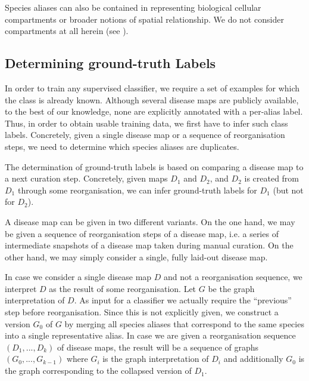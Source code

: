 \documentclass[
	fontsize=10pt, %
	twoside=true, %
	secnumdepth=1, %
  toc=indentunnumbered %
]{kaobook}
\begin{document}
Species aliases can also be contained in  representing
biological cellular compartments or broader notions of spatial relationship. We
do not consider compartments at all herein (see ).





\subsection{Determining ground-truth Labels}
\label{sec:determining-labels}

In order to train any supervised classifier, we require a set of examples for
which the class is already known. Although several disease maps are publicly
available, to the best of our knowledge, none are explicitly annotated with a
per-alias label. Thus, in order to obtain usable training data, we first have to
infer such class labels. Concretely, given a single disease map or a sequence of
reorganisation steps, we need to determine which species aliases are duplicates.

The determination of ground-truth labels is based on comparing a disease map to
a next curation step. Concretely, given maps $D_1$ and $D_2$, and $D_2$ is
created from $D_1$ through some reorganisation, we can infer ground-truth
labels for $D_1$ (but not for $D_2$). 

A disease map can be given in two different variants. On the one hand, we may be
given a sequence of reorganisation steps of a disease map, i.e. a series of intermediate
snapshots of a disease map taken during manual curation. On the other hand, we
may simply consider a single, fully laid-out disease map.

In case we consider a single disease map $D$ and not a reorganisation sequence,
we interpret $D$ as the result of some reorganisation. Let $G$ be the graph
interpretation of $D$. As input for a classifier we actually require the
``previous'' step before reorganisation. Since this is not explicitly given, we
construct a  version $G_0$ of $G$ by merging all species aliases
that correspond to the same species into a single representative alias.
%
In case we are given a reorganisation sequence $(D_1, ..., D_k)$ of disease
maps, the result will be a sequence of graphs $(G_0, ..., G_{k-1})$ where $G_i$
is the graph interpretation of $D_i$ and additionally $G_0$ is the graph
corresponding to the collapsed version of $D_1$. 
\end{document}
